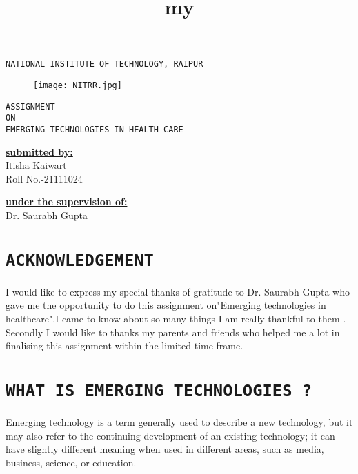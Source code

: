 \documentclass[12pt]{article}
\title{my}
\begin{document}
\centering\huge\texttt{NATIONAL INSTITUTE OF TECHNOLOGY, RAIPUR}\\

\begin{figure}[h]
\centering
\texttt{[image: NITRR.jpg]}
\end{figure}

\begin{center}


\huge\texttt{ASSIGNMENT \\ON\\ EMERGING TECHNOLOGIES IN HEALTH CARE}

\end{center}

\begin{minipage}[t]{5cm}
\flushleft\Large\textbf{\underline{submitted by:}}\\
Itisha Kaiwart\\
Roll No.-21111024
\end{minipage}
\hfill
\begin{minipage}[t]{5cm}
\Large\textbf{\underline{under the supervision of:}}\\
Dr. Saurabh Gupta
\end{minipage}


\newpage
\tableofcontents
\newpage

\section{\LARGE\texttt{ACKNOWLEDGEMENT}}

\large \flushleft I would like to express my special thanks of gratitude to Dr. Saurabh Gupta who gave me the opportunity to do this assignment on"Emerging technologies in healthcare".I came to know about so many things I am really thankful to them .\\



\vspace{1cm}
Secondly I would like to thanks my parents and friends who helped me a lot in finalising this assignment within the limited time frame.

\pagebreak

\section{\LARGE\centering\texttt{WHAT IS EMERGING TECHNOLOGIES ?}}

\large\flushleft Emerging technology is a term generally used to describe a new technology, but it may also refer to the continuing development of an existing technology; it can have slightly different meaning when used in different areas, such as media, business, science, or education. \\
\end{document}

